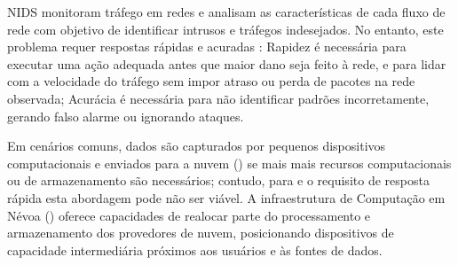 \acf{NIDS} monitoram tráfego em redes e analisam as características de cada
fluxo de rede com objetivo de identificar intrusos e tráfegos indesejados.
No entanto, este problema requer respostas rápidas e acuradas \cite{DaCosta2019a}:
Rapidez é necessária para executar uma ação adequada antes que
maior dano seja feito à rede, e para lidar com a velocidade do tráfego sem impor
atraso ou perda de pacotes na rede observada;
Acurácia é necessária para não  identificar padrões incorretamente, gerando falso
alarme ou ignorando ataques.


Em cenários \iot comuns, dados são capturados por pequenos dispositivos
computacionais e enviados para a nuvem (\cloud) se mais mais recursos
computacionais ou de armazenamento são necessários; contudo, para \nids e o
requisito de resposta rápida esta abordagem pode não ser viável.
A infraestrutura de Computação em Névoa (\fog) oferece capacidades de realocar
parte do processamento e armazenamento dos provedores de nuvem, posicionando
dispositivos de capacidade intermediária próximos aos usuários e às fontes de dados.


